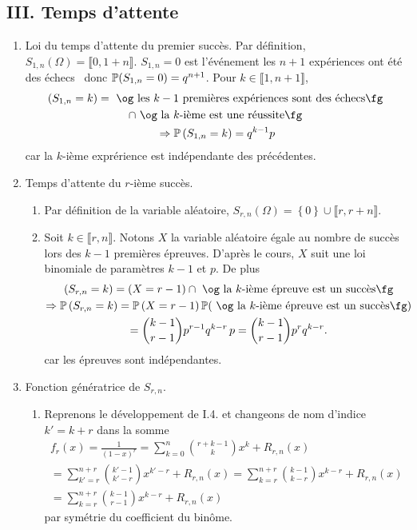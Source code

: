 \subsection*{III. Temps d'attente}
\begin{enumerate}
  \item Loi du temps d'attente du premier succès. Par définition, $S_{1,n}(\Omega) = \llbracket 0, 1+n \rrbracket$.\newline
  $S_{1,n} = 0$ est l'événement \og les $n+1$ expériences ont été des échecs\fg~ donc $\mathbb{P}(S_{1,n} = 0) = q^{n+1}$.\newline
  Pour $k \in \llbracket 1,n + 1\rrbracket$,
\begin{multline*}
  \left(S_{1,n} = k\right) =\text{ \og les $k-1$ premières expériences sont des échecs\fg } \\
  \cap \text{ \og la $k$-ième est une réussite\fg }\\
  \Rightarrow \p\left(S_{1,n} = k\right) = q^{k-1}p
\end{multline*}
car la $k$-ième exprérience est indépendante des précédentes.
  \item Temps d'attente du $r$-ième succès.
  \begin{enumerate}
    \item Par définition de la variable aléatoire, $S_{r,n}(\Omega) = \left\lbrace 0 \right\rbrace \cup \llbracket r, r + n \rrbracket$.
    \item Soit $k \in \llbracket r,n \rrbracket $. Notons $X$ la variable aléatoire égale au nombre de succès lors des $k-1$ premières épreuves. D'après le cours, $X$ suit une loi binomiale de paramètres $k-1$ et $p$. De plus
\begin{multline*}
  \left( S_{r,n} = k\right) = \left( X = r-1\right) \cap \text{ \og la $k$-ième épreuve est un succès\fg}\\
  \Rightarrow
  \p\left( S_{r,n} = k\right) = \p\left( X = r-1\right)  \p(\text{ \og la $k$-ième épreuve est un succès\fg})\\
  = \binom{k-1}{r-1}p^{r-1}q^{k-r}\, p
  = \binom{k-1}{r-1}p^{r}q^{k-r}.
\end{multline*}
car les épreuves sont indépendantes.
  \end{enumerate}

  \item Fonction génératrice de $S_{r,n}$.
  \begin{enumerate}
    \item Reprenons le développement de I.4. et changeons de nom d'indice $k' = k+r$ dans la somme
\begin{multline*}
  f_r(x) = \frac{1}{(1-x)^r} = \sum_{k=0}^{n} \binom{r+k-1}{k} x^k + R_{r,n}(x) \\
  = \sum_{k' = r}^{n +r} \binom{k'-1}{k'-r} x^{k'-r} + R_{r,n}(x) 
  = \sum_{k = r}^{n +r} \binom{k-1}{k-r} x^{k-r} + R_{r,n}(x) \\
  = \sum_{k = r}^{n +r} \binom{k-1}{r - 1} x^{k-r} + R_{r,n}(x)
\end{multline*}
par symétrie du coefficient du binôme.


\end{enumerate}
\end{enumerate}
